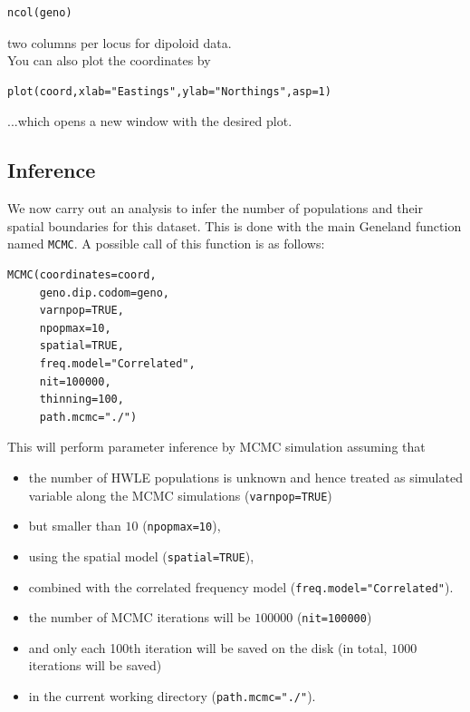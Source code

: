 \documentclass{article}
\begin{document}
\begin{verbatim}
ncol(geno)
\end{verbatim}



two columns per locus for dipoloid data.\\


You can also plot the coordinates by 

\begin{verbatim}
plot(coord,xlab="Eastings",ylab="Northings",asp=1)
\end{verbatim}



...which opens a new window with the desired plot.


\subsection{Inference}\label{sec:example_MCMC}

We now carry out an analysis to infer the number of populations and their spatial boundaries for this dataset.
This is done with the main {\sc Geneland} function named {\tt MCMC}. 
A possible call of this function is as follows:

\begin{verbatim}
MCMC(coordinates=coord,
     geno.dip.codom=geno,
     varnpop=TRUE, 
     npopmax=10,
     spatial=TRUE,
     freq.model="Correlated",
     nit=100000,
     thinning=100,
     path.mcmc="./")
\end{verbatim}



This will perform parameter inference by MCMC simulation assuming 
that 
\begin{itemize}
\item the number of HWLE populations is unknown and hence treated as simulated 
variable along the MCMC simulations (\texttt{varnpop=TRUE}) 
\item but smaller than $10$ (\texttt{npopmax=10}), 
\item using the spatial model (\texttt{spatial=TRUE}), 
\item combined with 
the correlated frequency model (\texttt{freq.model="Correlated"}). 
\item the number of MCMC iterations will be $100000$ (\texttt{nit=100000}) 
\item and only each 100th iteration will be saved on the disk (in total, $1000$ iterations will be saved)
\item in the current working directory (\texttt{path.mcmc="./"}).
\end{itemize}
\end{document}
